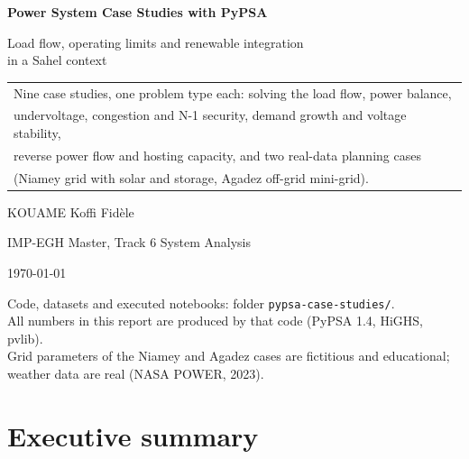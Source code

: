 \documentclass[11pt,a4paper]{article}
\begin{document}
\begin{titlepage}
\centering
\vspace*{2.2cm}
{\LARGE\bfseries Power System Case Studies with PyPSA\par}
\vspace{0.4cm}
{\Large Load flow, operating limits and renewable integration\\ in a Sahel context\par}
\vspace{1.4cm}
\begin{tabular}{l}
\toprule
Nine case studies, one problem type each: solving the load flow, power balance,\\
undervoltage, congestion and N-1 security, demand growth and voltage stability,\\
reverse power flow and hosting capacity, and two real-data planning cases\\
(Niamey grid with solar and storage, Agadez off-grid mini-grid).\\
\bottomrule
\end{tabular}
\vspace{1.6cm}

{\large KOUAME Koffi Fidèle\par}
\vspace{0.2cm}
{\normalsize IMP-EGH Master, Track 6 System Analysis\par}
\vspace{0.2cm}
{\normalsize \today\par}
\vfill
{\small\color{ink2}
Code, datasets and executed notebooks: folder \texttt{pypsa-case-studies/}.\\
All numbers in this report are produced by that code (PyPSA 1.4, HiGHS, pvlib).\\
Grid parameters of the Niamey and Agadez cases are fictitious and educational;\\
weather data are real (NASA POWER, 2023).\par}
\end{titlepage}

\tableofcontents
\clearpage

\section*{Executive summary}
\end{document}
